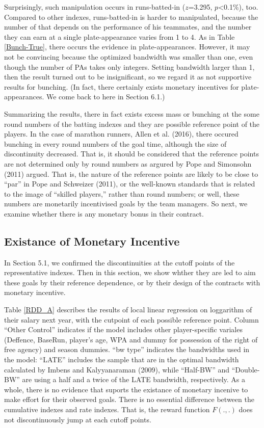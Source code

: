 \documentclass[dvipdfmx, 12pt]{article}
\begin{document}
Surprisingly, such manipulation occurs in runs-batted-in ($z$=3.295, $p$<0.1\%), too. Compared to other indexes, runs-batted-in is harder to manipulated, because the number of that depends on the performance of his teammates, and the number they can earn at a single plate-appearance varies from 1 to 4. As in Table \ref{Bunch-True}, there occurs the evidence in plate-appearances. However, it may not be convincing because the optimized bandwidth was smaller than one, even though the number of PAs takes only integers. Setting bandwidth larger than 1, then the result turned out to be insignificant, so we regard it as not supportive results for bunching. (In fact, there certainly exists monetary incentives for plate-appearances. We come back to here in Section 6.1.)

Summarizing the results, there in fact exists excess mass or bunching at the some round numbers of the batting indexes and they are possible reference point of the players. In the case of marathon runners, Allen et al. (2016), there occured bunching in every round numbers of the goal time, although the size of discontinuity decreased. That is, it should be considered that the reference points are not determined only by round numbers as argured by Pope and Simonsohn (2011) argued. That is, the nature of the reference points are likely to be close to ``par'' in Pope and Schweizer (2011), or the well-known standards that is related to the image of ``skilled players,'' rather than round numbers; or well, these numbers are monetarily incentivised goals by the team managers. So next, we examine whether there is any monetary bonus in their contract.

\subsection{Existance of Monetary Incentive}

In Section 5.1, we confirmed the discontinuities at the cutoff points of the representative indexes. Then in this section, we show whther they are led to aim these goals by their reference dependence, or by their design of the contracts with monetary incentive.

Table \ref{RDD_A} describes the results of local linear regression on loggarithm of their salary next year, with the cutpoint of each possible reference point. Column ``Other Control'' indicates if the model includes other player-specific variales (Deffence, BaseRun, player's age, WPA and dummy for possession of the right of free agency) and season dummies. ``bw type'' indicates the bandwidths used in the model: ``LATE'' includes the sample that are in the optimal bandwidth calculated by Imbens and Kalyyanaraman (2009), while ``Half-BW'' and ``Double-BW'' are using a half and a twice of the LATE bandwidth, respectively. As a whole, there is no evidence that suports the existance of monetary incenive to make effort for their observed goals. There is no essential difference between the cumulative indexes and rate indexes. That is, the reward function $F(.,.)$ does not discontinuously jump at each cutoff points.
\end{document}
